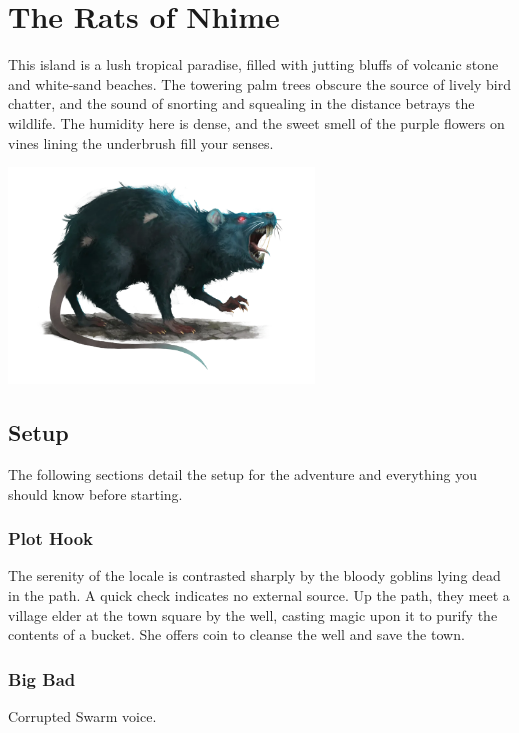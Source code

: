 \pfMakeSplashHeader[
  image = oneshot,
  title = The Rats of Nhime,
  headerHeight = -7cm,
  textBodyHeight = 6cm
]

\chapter{The Rats of Nhime}

This island is a lush tropical paradise, filled with jutting bluffs of volcanic stone and white-sand beaches. The towering palm trees obscure the source of lively bird chatter, and the sound of snorting and squealing in the distance betrays the wildlife. The humidity here is dense, and the sweet smell of the purple flowers on vines lining the underbrush fill your senses.

\begin{multicols}{2}

  \begin{minipage}[t]{.48\textwidth}
    \includegraphics[width=3.2in]{book/img/Giant_Rat}
  \end{minipage}

  \section{Setup}
  The following sections detail the setup for the adventure and everything you should know before starting.

  \subsection{Plot Hook}
  The serenity of the locale is contrasted sharply by the bloody goblins lying dead in the path. A quick check indicates no external source. Up the path, they meet a village elder at the town square by the well, casting magic upon it to purify the contents of a bucket. She offers coin to cleanse the well and save the town.

  \subsection{Big Bad}
  Corrupted Swarm voice.


\end{multicols}
